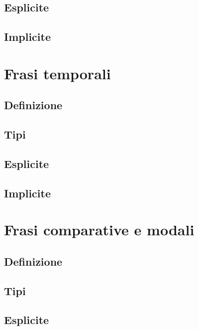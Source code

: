 \documentclass[a4paper,twoside,11pt,chapterprefix=false,bibliography=totocnumbered,listof=flat]{scrbook}
\begin{document}
\section{Esplicite}\label{esplicite-1}

\section{Implicite}\label{implicite-1}

\chapter{Frasi temporali}\label{frasi-temporali}

\section{Definizione}\label{definizione}

\section{Tipi}\label{tipi-1}

\section{Esplicite}\label{esplicite-2}

\section{Implicite}\label{implicite-2}

\chapter{Frasi comparative e modali}\label{frasi-comparative-e-modali}

\section{Definizione}\label{definizione-1}

\section{Tipi}\label{tipi-2}

\section{Esplicite}\label{esplicite-3}
\end{document}
